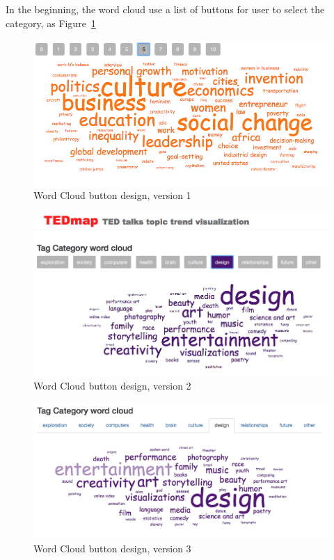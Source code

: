 \documentclass{report}
\numberwithin{figure}{section}
\begin{document}
\quad In the beginning, the word cloud use a list of buttons for user to select the category, as Figure~\ref{fig:wcbutton1}

\begin{figure}
\begin{center}
\includegraphics[scale=0.5]{wcbutton1}
\caption{Word Cloud button design, version 1}
\label{fig:wcbutton1}
\end{center}
\end{figure}

\begin{figure}
\begin{center}
\includegraphics[scale=0.5]{wcbutton2}
\caption{Word Cloud button design, version 2}
\label{fig:wcbutton2}
\end{center}
\end{figure}

\begin{figure}
\begin{center}
\includegraphics[scale=0.5]{wcbutton3}
\caption{Word Cloud button design, version 3}
\label{fig:wcbutton3}
\end{center}
\end{figure}
\end{document}
